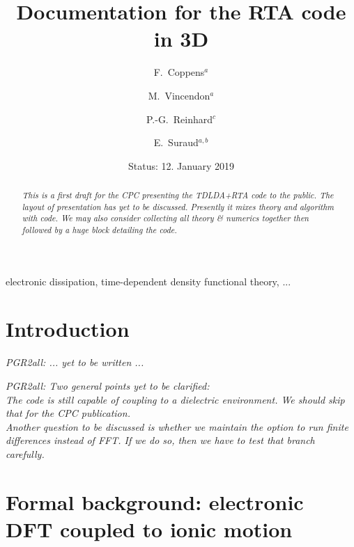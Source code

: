 \documentclass[final,1p]{elsarticle}
\newcommand{\PGR}[1]{{\color{blue} #1}}
\newcommand{\PGRcomm}[1]{{\color{blue}\small\em PGR2all: #1}}
\begin{document}
\begin{frontmatter}

\title{Documentation for the RTA code in 3D}

\author{F.~Coppens$^a$}
\author{M.~Vincendon$^a$}
\author{P.-G.~Reinhard$^c$}
\author{E.~Suraud$^{a,b}$}
\address{$^a$Universit\'e de Toulouse; UPS; Laboratoire de Physique
             Th\'{e}orique, IRSAMC; F-31062 Toulouse Cedex, France}
\address{$^b$Laboratoire de Physique Th\'eorique, Universit\'e Paul
  Sabatier, CNRS, F-31062 Toulouse C\'edex, France}
\address{$^c$Institut f{\"u}r Theoretische Physik, Universit{\"a}t
  Erlangen, D-91058 Erlangen, Germany}

\date{Status: 12. January 2019}
\begin{abstract}
\PGR{\em This is a first draft for the CPC presenting the TDLDA+RTA code
  to the public. The layout of presentation has yet to be discussed.
Presently it mixes theory and algorithm with code. We may also
consider collecting all theory \& numerics together then followed by a
huge block detailing the code.}
\end{abstract}

\begin{keyword}
electronic dissipation, time-dependent
density functional theory, ...
\end{keyword}
\end{frontmatter}

\tableofcontents


\section{Introduction}

\PGRcomm{... yet to be written ...}


\noindent
\PGRcomm{Two general points yet to be clarified:
\\
The code is still capable of coupling to a dielectric
  environment. We should skip that for the CPC publication.
\\
Another question to be discussed is whether we maintain the option to
run finite differences instead of FFT. If we do so, then we have to
test that branch carefully.
}


\section{Formal background: electronic DFT coupled to ionic motion}
\label{sec:TDLDA}
\end{document}
